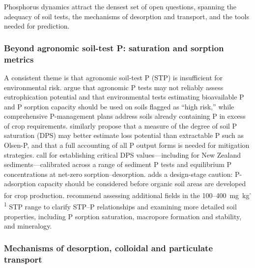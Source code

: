 Phosphorus dynamics attract the densest set of open questions, spanning the adequacy of soil tests, the mechanisms of desorption and transport, and the tools needed for prediction.

\subsubsection{Beyond agronomic soil-test P: saturation and sorption metrics}

A consistent theme is that agronomic soil-test P (STP) is insufficient for environmental risk. \textcite{Sharpley1995} argue that agronomic P tests may not reliably assess eutrophication potential and that environmental tests estimating bioavailable P and P sorption capacity should be used on soils flagged as ``high risk,'' while comprehensive P-management plans address soils already containing P in excess of crop requirements. \textcite{Hooda1999} similarly propose that a measure of the degree of soil P saturation (DPS) may better estimate loss potential than extractable P such as Olsen-P, and that a full accounting of all P output forms is needed for mitigation strategies. \textcite{Nguyen2002} call for establishing critical DPS values---including for New Zealand sediments---calibrated across a range of sediment P tests and equilibrium P concentrations at net-zero sorption--desorption. \textcite{MILLER1979} adds a design-stage caution: P-adsorption capacity should be considered before organic soil areas are developed for crop production. \textcite{Osterholz2020} recommend assessing additional fields in the 100--400~mg~kg\textsuperscript{-1} STP range to clarify STP--P relationships and examining more detailed soil properties, including P sorption saturation, macropore formation and stability, and mineralogy.

\subsubsection{Mechanisms of desorption, colloidal and particulate transport}


